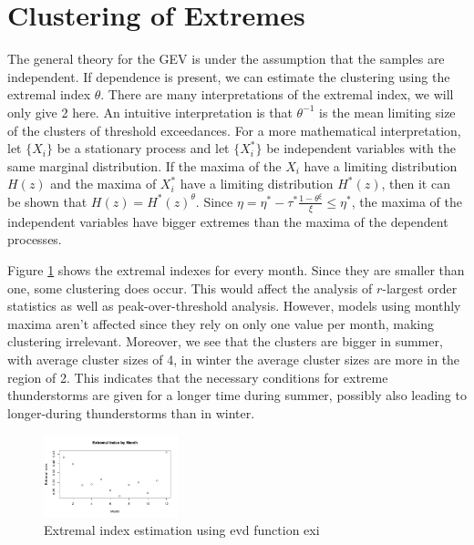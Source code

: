 \documentclass[10pt,conference,compsocconf]{IEEEtran}
\begin{document}
\section*{Clustering of Extremes}
The general theory for the GEV is under the assumption that the samples are independent. If dependence is present, we can estimate the clustering using the extremal index $\theta$. There are many interpretations of the extremal index, we will only give 2 here. An intuitive interpretation is that $\theta^{-1}$ is the mean limiting size of the clusters of threshold exceedances. For a more mathematical interpretation, let $\{X_i\}$ be a stationary process and let  $\{X_i^*\}$ be independent variables with the same marginal distribution. If the maxima of the $X_i$ have a limiting distribution $H(z)$ and the maxima of $X_i^*$ have a limiting distribution $H^*(z)$, then it can be shown that $H(z)=H^*(z)^\theta$. Since $\eta=\eta^*-\tau^*\frac{1-\theta^\xi}{\xi}\leq\eta^*$, the maxima of the independent variables have bigger extremes than the maxima of the dependent processes. 
\par
Figure \ref{fig:extremal_index} shows the extremal indexes for every month. Since they are smaller than one, some clustering does occur. This would affect the analysis of $r$-largest order statistics as well as peak-over-threshold analysis. However, models using monthly maxima aren't affected since they rely on only one value per month, making clustering irrelevant. Moreover, we see that the clusters are bigger in summer, with average cluster sizes of 4, in winter the average cluster sizes are more in the region of 2. This indicates that the necessary conditions for extreme thunderstorms are given for a longer time during summer, possibly also leading to longer-during thunderstorms than in winter. 

\begin{figure}
	\centering
	\includegraphics[width=0.35\textwidth]{../plots/extermal_index.pdf}
	\caption{Extremal index estimation using evd function exi}
	\label{fig:extremal_index}
\end{figure}
\end{document}
